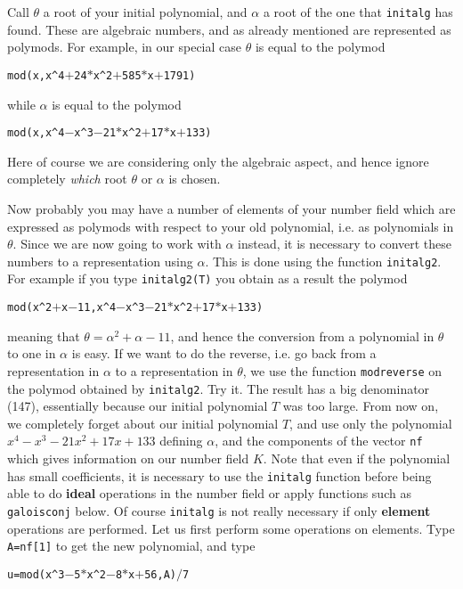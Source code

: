 Call $\theta$ a root of your initial polynomial, and $\alpha$ a root of the
one that {\tt initalg} has found. These are algebraic numbers, and as already
mentioned are represented as polymods. For example, in our special case
$\theta$ is equal to the polymod 

\centerline{\tt mod(x,x\^{}4$+$24$*$x\^{}2$+$585$*$x$+$1791)}

while $\alpha$ is equal to the polymod

\centerline{\tt mod(x,x\^{}4$-$x\^{}3$-$21$*$x\^{}2$+$17$*$x$+$133)}

Here of course we are considering only the algebraic aspect, and hence ignore
completely {\it which} root $\theta$ or $\alpha$ is chosen.

Now probably you may have a number of elements of your number field which
are expressed as polymods with respect to your old polynomial, i.e. as
polynomials in $\theta$. Since we are now going to work with $\alpha$ instead,
it is necessary to convert these numbers to a representation using $\alpha$.
This is done using the function {\tt initalg2}. For example if you type
{\tt initalg2(T)} you obtain as a result the polymod

\centerline{\tt mod(x\^{}2$+$x$-$11,x\^{}4$-$x\^{}3$-$21$*$x\^{}2$+$17$*$x$+$133)}

meaning that $\theta=\alpha^2+\alpha-11$, and hence the conversion from a 
polynomial in $\theta$ to one in $\alpha$ is easy. If we want to do the
reverse, i.e. go back from a representation in $\alpha$ to a representation
in $\theta$, we use the function {\tt modreverse} on the polymod obtained
by {\tt initalg2}. Try it. The result has a big denominator (147), essentially
because our initial polynomial $T$ was too large.
\smallskip
From now on, we completely forget about our initial polynomial $T$, and use
only the polynomial $x^4-x^3-21x^2+17x+133$ defining $\alpha$, and
the components of the vector {\tt nf} which gives information on our number
field $K$. Note that even if the polynomial has small coefficients,
it is necessary to use the {\tt initalg} function before being able to do
{\bf ideal} operations in the number field or apply functions such as
{\tt galoisconj} below. Of course {\tt initalg} is not
really necessary if only {\bf element} operations are performed.
\smallskip
Let us first perform some operations on elements. Type {\tt A=nf[1]} to get
the new polynomial, and type 

\centerline{\tt u=mod(x\^{}3$-$5$*$x\^{}2$-$8$*$x$+$56,A)$/$7} 


